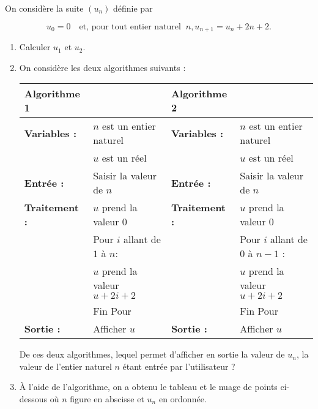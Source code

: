 On considère la suite $\left(u_{n}\right)$ définie par 

\[u_{0} = 0\quad  \text{et, pour tout entier naturel }\:n, u_{n+1} = u_{n} + 2n + 2.\]
 
\begin{enumerate}
\item Calculer $u_{1}$ et $u_{2}$. 
\item On considère les deux algorithmes suivants : 

\medskip

\hspace*{-1cm}
{\footnotesize
\begin{tabularx}{1.1\linewidth}{|l X|l X|}\hline
\textbf{Algorithme 1}&	&\textbf{Algorithme 2}&\\ \hline
\textbf{Variables :}& 	$n$ est un entier naturel&\textbf{Variables :}& 	$n$ est un entier naturel\\  
&$u$ est un réel &	&$u$ est un réel \\
\textbf{Entrée :}&Saisir la valeur de $n$&\textbf{Entrée :}&Saisir la valeur de $n$\\
\textbf{Traitement :}& 	$u$ prend la valeur 0&\textbf{Traitement :}& 	$u$ prend la valeur $0$\\
 &Pour $i$ allant de $1$ à $n$: && Pour $i$ allant de $0$ à $n - 1$ :\\
&\hspace{0,2cm} $u$ prend la valeur $u + 2i + 2$&&\hspace{0,2cm} $u$ prend la valeur $u + 2i + 2$\\
& Fin Pour&	&Fin Pour\\
\textbf{Sortie :}& 	Afficher $u$&\textbf{Sortie :}& 	Afficher $u$\\ \hline
\end{tabularx}}
 
\medskip
 
De ces deux algorithmes, lequel permet d'afficher en sortie la valeur de $u_{n}$, la valeur de l'entier naturel $n$ étant entrée par l'utilisateur ? 
\item À l'aide de l'algorithme, on a obtenu le tableau et le nuage de points ci-dessous où $n$ figure en abscisse et $u_{n}$ en ordonnée. 

\medskip


\end{enumerate}
